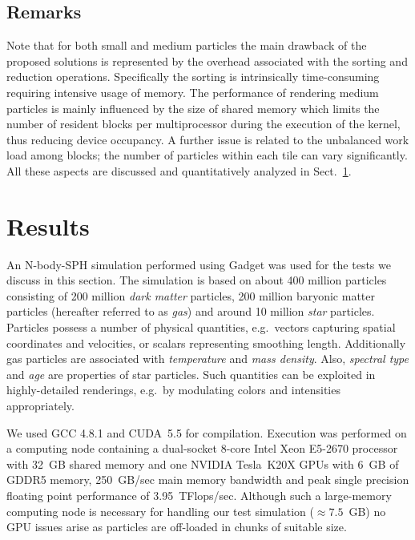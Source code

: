 \documentclass[preprint,5pt]{elsarticle}
\begin{document}
\subsection{Remarks}
Note that for both small and medium particles the main drawback of the proposed solutions
is represented by the overhead associated with the sorting and reduction operations. Specifically the sorting is intrinsically time-consuming requiring intensive usage of memory.
The performance of rendering medium particles is mainly influenced
by the size of shared memory which limits the number of resident blocks
per multiprocessor during the execution of the kernel, thus reducing device occupancy. 
A further issue is related to the unbalanced work load among blocks; the number of particles within each tile can vary significantly. All these aspects are discussed and quantitatively analyzed in Sect.~\ref{sec:results}.

\section{Results}
\label{sec:results}

An N-body-SPH simulation performed using Gadget \cite{gadgeturl} was used for the tests we discuss in this section. The simulation is based on about 400 million particles consisting of 200 million {\it dark matter} particles, 200 million baryonic matter particles (hereafter referred to as {\it gas}) and around 10 million {\it star} particles. Particles possess a number of physical quantities, e.g.\ vectors capturing spatial coordinates and velocities, or scalars representing smoothing length. Additionally gas particles are associated with {\it temperature} and {\it mass density}. Also, {\it spectral type} and {\it age} are properties of star particles. Such quantities can be exploited in highly-detailed renderings, e.g.\ by modulating colors and intensities appropriately. 

We used GCC 4.8.1 and CUDA~5.5 for compilation. Execution was performed on a computing node containing a dual-socket 8-core Intel Xeon E5-2670 processor with 32~GB shared memory and one NVIDIA Tesla~K20X GPUs with 6~GB of GDDR5 memory, 250~GB/sec main memory bandwidth and peak single precision floating point performance of 3.95~TFlops/sec. Although such a large-memory computing node is necessary for handling our test simulation ($\approx 7.5$~GB) no GPU issues arise as particles are off-loaded in chunks of suitable size. 
\end{document}
